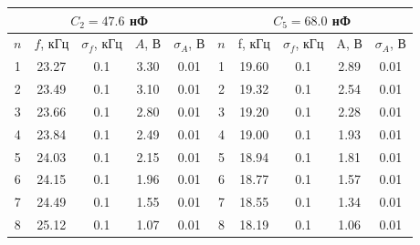 \documentclass[a4paper,14pt]{article}
\begin{document}
\begin{enumerate}
\begin{table}[hbt!]
\begin{center}
	\begin{tabular}{ccccc||c|c|c|c|c|}
		\hline
		\multicolumn{5}{|c||}{$C_2 = 47.6$ нФ}                                                                                                         & \multicolumn{5}{c|}{$C_5 = 68.0$ нФ}        \\ \hline
		\multicolumn{1}{|c|}{$n$} & \multicolumn{1}{c|}{$f$, кГц} & \multicolumn{1}{c|}{$\sigma_f$, кГц} & \multicolumn{1}{c|}{$A$, В} & $\sigma_A$, В         & $n$ & f, кГц & $\sigma_f$, кГц & A, В & $\sigma_A$, В \\ \hline
		\multicolumn{1}{|c|}{1}   & \multicolumn{1}{c|}{23.27}     & \multicolumn{1}{c|}{0.1}             & \multicolumn{1}{c|}{3.30}   & 0.01                  & 1   & 19.60     & 0.1             & 2.89 & 0.01          \\ \hline
		\multicolumn{1}{|c|}{2}   & \multicolumn{1}{c|}{23.49}     & \multicolumn{1}{c|}{0.1}             & \multicolumn{1}{c|}{3.10}   & 0.01                  & 2   & 19.32   & 0.1             & 2.54 & 0.01          \\ \hline
		\multicolumn{1}{|c|}{3}   & \multicolumn{1}{c|}{23.66}       & \multicolumn{1}{c|}{0.1}             & \multicolumn{1}{c|}{2.80}   & 0.01                  & 3   & 19.20   & 0.1             & 2.28 & 0.01          \\ \hline
		\multicolumn{1}{|c|}{4}   & \multicolumn{1}{c|}{23.84}     & \multicolumn{1}{c|}{0.1}             & \multicolumn{1}{c|}{2.49}   & 0.01                  & 4   & 19.00   & 0.1             & 1.93 & 0.01          \\ \hline
		\multicolumn{1}{|c|}{5}   & \multicolumn{1}{c|}{24.03}       & \multicolumn{1}{c|}{0.1}             & \multicolumn{1}{c|}{2.15}   & 0.01                  & 5   & 18.94     & 0.1             & 1.81 & 0.01          \\ \hline
		\multicolumn{1}{|c|}{6}   & \multicolumn{1}{c|}{24.15}     & \multicolumn{1}{c|}{0.1}             & \multicolumn{1}{c|}{1.96}   & 0.01                  & 6   & 18.77   & 0.1             & 1.57 & 0.01          \\ \hline
		\multicolumn{1}{|c|}{7}   & \multicolumn{1}{c|}{24.49}     & \multicolumn{1}{c|}{0.1}             & \multicolumn{1}{c|}{1.55}   & 0.01                  & 7   & 18.55   & 0.1             & 1.34 & 0.01          \\ \hline
		\multicolumn{1}{|c|}{8}   & \multicolumn{1}{c|}{25.12}     & \multicolumn{1}{c|}{0.1}             & \multicolumn{1}{c|}{1.07}   & 0.01                  & 8   & 18.19   & 0.1             & 1.06 & 0.01          \\ \hline

\end{tabular}
\end{center}
\end{table}
\end{enumerate}
\end{document}
